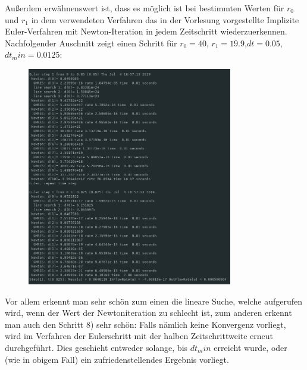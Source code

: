 Außerdem erwähnenswert ist, dass es möglich ist bei bestimmten Werten für $r_0$ und $r_1$ in dem verwendeten Verfahren das in der Vorlesung vorgestellte Implizite Euler-Verfahren mit Newton-Iteration in jedem Zeitschritt wiederzuerkennen.
Nachfolgender Auschnitt zeigt einen Schritt für $r_0 = 40$, $r_1=19.9$,$dt = 0.05$,$dt_min=0.0125$:
\begin{figure}[H]
	\centering
	\includegraphics[width=0.80\textwidth]{../Aufgabe30/algorithmus.png}
\end{figure}
Vor allem erkennt man sehr schön zum einen die lineare Suche, welche aufgerufen wird, wenn der Wert der Newtoniteration zu schlecht ist, zum anderen erkennt man auch den Schritt 8) sehr schön: 
Falls nämlich keine Konvergenz vorliegt, wird im Verfahren der Eulerschritt mit der halben Zeitschrittweite erneut durchgeführt. Dies geschieht entweder solange, bis $dt_min$ erreicht wurde, oder (wie in obigem Fall) ein zufriedenstellendes Ergebnis vorliegt.
